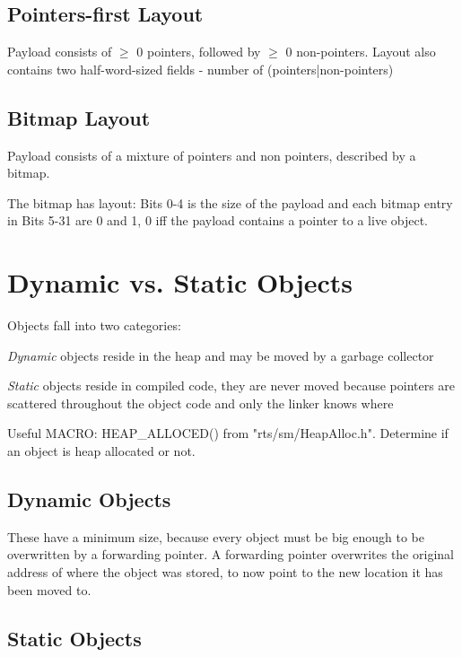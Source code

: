 \documentclass[a4paper,11pt]{article}
\begin{document}
\subsection{Pointers-first Layout}

Payload consists of $\geq$ 0 pointers, followed by $\geq$ 0 non-pointers. Layout also contains two half-word-sized fields - number of (pointers|non-pointers)

\subsection{Bitmap Layout}

Payload consists of a mixture of pointers and non pointers, described by a bitmap.

The bitmap has layout: Bits 0-4 is the size of the payload and each bitmap entry in Bits 5-31 are 0 and 1, 0 iff the payload contains a pointer to a live object.

\section{Dynamic vs. Static Objects}

Objects fall into two categories:

\begin{description}
\item \textit{Dynamic} objects reside in the heap and may be moved by a garbage collector
\item \textit{Static} objects reside in compiled code, they are never moved because pointers are scattered throughout the object code and only the linker knows where
\end{description}

Useful MACRO: HEAP\_ALLOCED() from "rts/sm/HeapAlloc.h". Determine if an object is heap allocated or not.

\subsection{Dynamic Objects}

These have a minimum size, because every object must be big enough to be overwritten by a forwarding pointer. A forwarding pointer overwrites the original address of where the object was stored, to now point to the new location it has been moved to.

\subsection{Static Objects}
\end{document}
